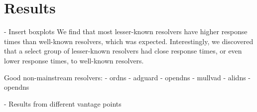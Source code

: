 \section{Results}\label{sec:results}
- Insert boxplots
We find that most lesser-known resolvers have higher response times than well-known resolvers, which was expected.
Interestingly, we discovered that a select group of lesser-known resolvers had close response times, or even lower response times, to well-known resolvers. 

Good non-mainstream resolvers: 
	- ordns
	- adguard 
	- opendns
	- mullvad
	- alidns
	- opendns



- Results from different vantage points